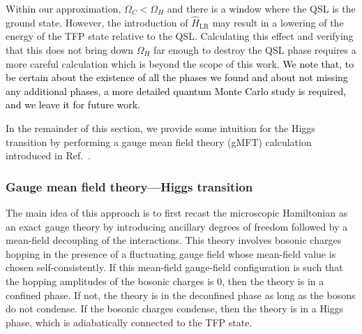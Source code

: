 \documentclass[twocolumn,superscriptaddress,amsmath,amssymb,aps,prx,nofootinbib]{revtex4-2}
\newcommand{\newtext}[1]{\textcolor{black}{#1}}
\begin{document}
Within our approximation, $\Omega_C<\Omega_H$ and there is a window where the QSL is the ground state. However, the introduction of $\hat{H}_{\text{LR}}$ may result in a lowering of the energy of the TFP state relative to the QSL. Calculating this effect and verifying that this does not bring down $\Omega_H$ far enough to destroy the QSL phase requires a more careful calculation which is beyond the scope of this work.
\newtext{We note that, to be certain about the existence of all the phases we found and about not missing any additional phases, a more detailed quantum Monte Carlo study is required, and we leave it for future work.}

In the remainder of this section, we provide some intuition for the Higgs transition by performing a gauge mean field theory (gMFT) calculation introduced in Ref.~\cite{savary2012coulombic}. 

\subsubsection{Gauge mean field theory---Higgs transition}\label{sec:gmft}
The main idea of this approach is to first recast the microscopic Hamiltonian as an exact gauge theory by introducing ancillary degrees of freedom followed by a mean-field decoupling of the interactions. This theory involves bosonic charges hopping in the presence of a fluctuating gauge field whose mean-field value is chosen self-consistently. If this mean-field gauge-field configuration is such that the hopping amplitudes of the bosonic charges is 0, then the theory is in a confined phase. If not, the theory is in the deconfined phase as long as the bosons do not condense. If the bosonic charges condense, then the theory is in a Higgs phase, which is adiabatically connected to the TFP state.
\end{document}
